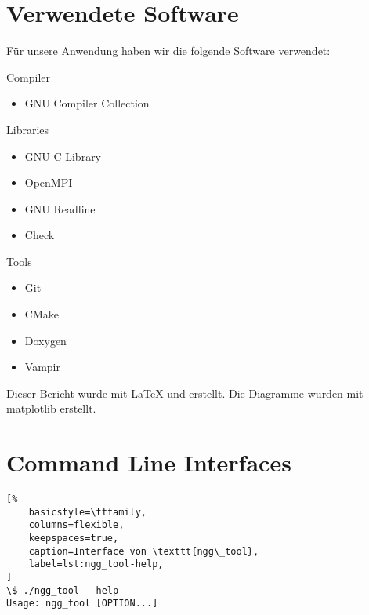 \begin{appendices}

\section{Verwendete Software}

Für unsere Anwendung haben wir die folgende Software verwendet:

Compiler
\begin{itemize}
    \item GNU Compiler Collection \cite{gcc}
\end{itemize}

Libraries
\begin{itemize}
    \item GNU C Library \cite{glibc}
    \item OpenMPI \cite{openmpi}
    \item GNU Readline \cite{readline}
    \item Check \cite{check}
\end{itemize}

Tools
\begin{itemize}
    \item Git \cite{git}
    \item CMake \cite{cmake}
    \item Doxygen \cite{doxygen}
    \item Vampir \cite{vampir}
\end{itemize}

Dieser Bericht wurde mit {\LaTeX} und {\KOMAScript} erstellt. Die Diagramme
wurden mit matplotlib \cite{matplotlib} erstellt.

\section{Command Line Interfaces}


\begin{lstlisting}[%
    basicstyle=\ttfamily,
    columns=flexible,
    keepspaces=true,
    caption=Interface von \texttt{ngg\_tool},
    label=lst:ngg_tool-help,
]
\$ ./ngg_tool --help
Usage: ngg_tool [OPTION...]


\end{lstlisting}
\end{appendices}
